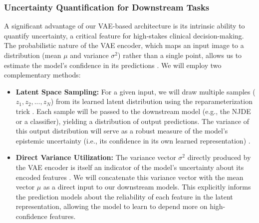 \documentclass[11pt, a4paper]{article}
\begin{document}
\subsubsection{Uncertainty Quantification for Downstream Tasks}
A significant advantage of our VAE-based architecture is its intrinsic ability to quantify uncertainty, a critical feature for high-stakes clinical decision-making. The probabilistic nature of the VAE encoder, which maps an input image to a distribution (mean $\mu$ and variance $\sigma^2$) rather than a single point, allows us to estimate the model's confidence in its predictions \cite{FriedrichFrisch2024, GautierBousse2024}. We will employ two complementary methods:
\begin{itemize}
    \item \textbf{Latent Space Sampling:} For a given input, we will draw multiple samples ($z_1, z_2, ..., z_N$) from its learned latent distribution using the reparameterization trick \cite{AbbasiMonadjemi2018}. Each sample will be passed to the downstream model (e.g., the NJDE or a classifier), yielding a distribution of output predictions. The variance of this output distribution will serve as a robust measure of the model's epistemic uncertainty (i.e., its confidence in its own learned representation) \cite{BustinMeyer2025}.
    \item \textbf{Direct Variance Utilization:} The variance vector $\sigma^2$ directly produced by the VAE encoder is itself an indicator of the model's uncertainty about its encoded features \cite{FriedrichFrisch2024}. We will concatenate this variance vector with the mean vector $\mu$ as a direct input to our downstream models. This explicitly informs the prediction models about the reliability of each feature in the latent representation, allowing the model to learn to depend more on high-confidence features.
\end{itemize}
\end{document}

